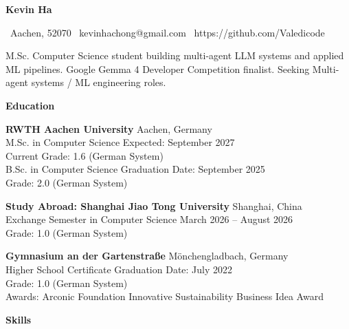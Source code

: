 \documentclass[10pt]{article}
\begin{document}
\begin{center}
    \textbf{\Large Kevin Ha}\\
    \hrulefill
\end{center}

\begin{center}
\textbullet \ Aachen, 52070 \textbullet \ kevinhachong@gmail.com \textbullet \ https://github.com/Valedicode 
\end{center}

\vspace{1pt}

\begin{center}
M.Sc. Computer Science student building multi-agent LLM systems and applied ML pipelines. Google Gemma 4 Developer Competition finalist. Seeking Multi-agent systems / ML engineering roles.
\end{center}

\vspace{1pt}

\begin{center}
    \textbf{\large Education}
\end{center}

\textbf{RWTH Aachen University} \hfill Aachen, Germany \\
M.Sc. in Computer Science \hfill Expected: September 2027 \\
Current Grade: 1.6 (German System) \\
B.Sc. in Computer Science \hfill Graduation Date: September 2025 \\
Grade: 2.0 (German System)
\vspace{4pt}

\textbf{Study Abroad: Shanghai Jiao Tong University} \hfill Shanghai, China \\
Exchange Semester in Computer Science \hfill March 2026 -- August 2026 \\
Grade: 1.0 (German System)
\vspace{4pt}

\textbf{Gymnasium an der Gartenstraße} \hfill Mönchengladbach, Germany \\
Higher School Certificate \hfill Graduation Date: July 2022 \\
Grade: 1.0 (German System) \\
Awards: Arconic Foundation Innovative Sustainability Business Idea Award

\vspace{1pt}

\begin{center}
    \textbf{\large Skills}
\end{center}
\end{document}
